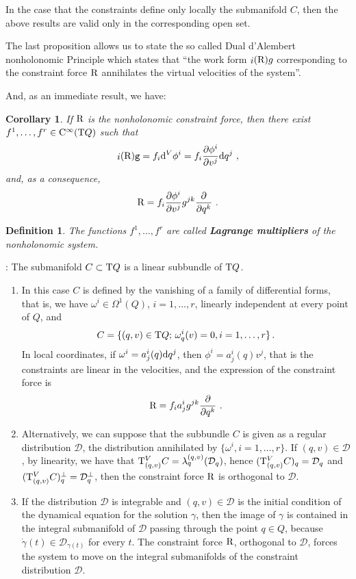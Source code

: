 \documentclass[12pt]{report}
\newtheorem{corol}[teor]{Corollary}
\newtheorem{definition}[teor]{Definition}
\def\derpar#1#2{\frac{\partial{#1}}{\partial{#2}}}
\def\coor#1#2#3{{#1}^{#2}, \ldots, {#1}^{#3}}
\def\d{{\rm d}}
\def\Tan{{\rm T}}
\def\inn{\mathop{i}\nolimits}
\def\Cinfty{{\rm C}^\infty}
\begin{document}
In the case that the constraints define only locally the submanifold $C$, then the above results are valid only in the corresponding open set.

The last proposition allows us to state the so called  
\rm{Dual d'Alembert nonholonomic Principle} which states that 
``the work form $\inn({\rm R})g$ corresponding to the constraint force ${\rm R}$ annihilates the virtual velocities of the system''.

And, as an immediate result, we have:

\begin{corol}
If ${\rm R}$ is the nonholonomic constraint force, then there exist
$\coor{f}{1}{r}\in\Cinfty (\Tan Q)$ such that
$$
\inn({\rm R}){\tt g}=f_i\d^V\phi^i=f_i\derpar{\phi^i}{v^j}\d q^j \ ,
$$
and, as a consequence,
$$
{\rm R}=f_i\derpar{\phi^i}{v^j}g^{jk}\derpar{}{q^k} \ .
$$
\end{corol}

\begin{definition}
The functions $\coor{f}{1}{r}$ are called {\sl \textbf{Lagrange multipliers}}
of the nonholonomic system.
\end{definition}

: The submanifold $C\subset\Tan Q$ is a linear subbundle of  $\Tan Q$. 
\begin{enumerate}
\item In this case $C$ is defined by the vanishing of a family of differential forms, that is, we have $\omega^{i}\in\Omega^{1}(Q)$, $i=1,\ldots,r$, linearly independent at every point of $Q$, and
$$
C=\{(q,v)\in\Tan Q;\, \omega^{i}_{q}(v)=0,i=1,\ldots,r\}\, .
$$
In local coordinates, if $\omega^{i}=a^{i}_{j}(q)\d q^{j}$, then $\phi^i=a^{i}_{j}(q)v^{j}$, that is the constraints are linear in the velocities, and the expression of the constraint force is
$$
{\rm R}=f_ia^i_{j}g^{jk}\derpar{}{q^k} \ .
$$
\item 
Alternatively, we can suppose that the subbundle $C$ is given as a regular distribution $\mathcal{D}$, the distribution annihilated by $\{\omega^{i}, i=1,\ldots,r\}$. If $(q,v)\in\mathcal{D}$, by linearity, we have that  $\Tan_{(q,v)}^VC=\lambda_{q}^{(q,v)} (\mathcal{D}_{q})$, hence $(\Tan_{(q,v)}^VC)_{q}=\mathcal{D}_{q}$ and $(\Tan_{(q,v)}^VC)^\perp_q=\mathcal{D}^\perp_q$, then the constraint force ${\rm R}$ is orthogonal to $\mathcal{D}$.

\item 
If the distribution $\mathcal{D}$ is integrable and $(q,v)\in\mathcal{D}$ is the initial condition of the dynamical equation for the solution $\gamma$, then the image of $\gamma$ is contained in the integral submanifold of $\mathcal{D}$ passing through the point $q\in Q$, because $\dot\gamma(t)\in\mathcal{D}_{\gamma(t)}$ for every $t$. The constraint force ${\rm R}$, orthogonal to $\mathcal{D}$, forces the system to move on the integral submanifolds of the constraint distribution $\mathcal{D}$.
\end{enumerate}
\end{document}
